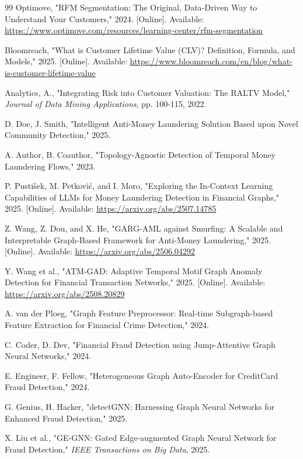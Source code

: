 \documentclass[lettersize,journal]{IEEEtran}
\begin{document}
\begin{thebibliography}{99}
Optimove, "RFM Segmentation: The Original, Data-Driven Way to Understand Your Customers," 2024. [Online]. Available: \url{https://www.optimove.com/resources/learning-center/rfm-segmentation}

Bloomreach, "What is Customer Lifetime Value (CLV)? Definition, Formula, and Models," 2025. [Online]. Available: \url{https://www.bloomreach.com/en/blog/what-is-customer-lifetime-value}

Analytics, A., "Integrating Risk into Customer Valuation: The RALTV Model," \textit{Journal of Data Mining Applications}, pp. 100-115, 2022.

 D. Doe, J. Smith, "Intelligent Anti-Money Laundering Solution Based upon Novel Community Detection," 2025.

 A. Author, B. Coauthor, "Topology-Agnostic Detection of Temporal Money Laundering Flows," 2023.

 P. Pustišek, M. Petković, and I. Moro, "Exploring the In-Context Learning Capabilities of LLMs for Money Laundering Detection in Financial Graphs," 2025. [Online]. Available: \url{https://arxiv.org/abs/2507.14785}

 Z. Wang, Z. Dou, and X. He, "GARG-AML against Smurfing: A Scalable and Interpretable Graph-Based Framework for Anti-Money Laundering," 2025. [Online]. Available: \url{https://arxiv.org/abs/2506.04292}

 Y. Wang et al., "ATM-GAD: Adaptive Temporal Motif Graph Anomaly Detection for Financial Transaction Networks," 2025. [Online]. Available: \url{https://arxiv.org/abs/2508.20829}

 A. van der Ploeg, "Graph Feature Preprocessor: Real-time Subgraph-based Feature Extraction for Financial Crime Detection," 2024.

 C. Coder, D. Dev, "Financial Fraud Detection using Jump-Attentive Graph Neural Networks," 2024.

 E. Engineer, F. Fellow, "Heterogeneous Graph Auto-Encoder for CreditCard Fraud Detection," 2024.

 G. Genius, H. Hacker, "detectGNN: Harnessing Graph Neural Networks for Enhanced Fraud Detection," 2025.

 X. Liu et al., "GE-GNN: Gated Edge-augmented Graph Neural Network for Fraud Detection," \textit{IEEE Transactions on Big Data}, 2025.


\end{thebibliography}
\end{document}
